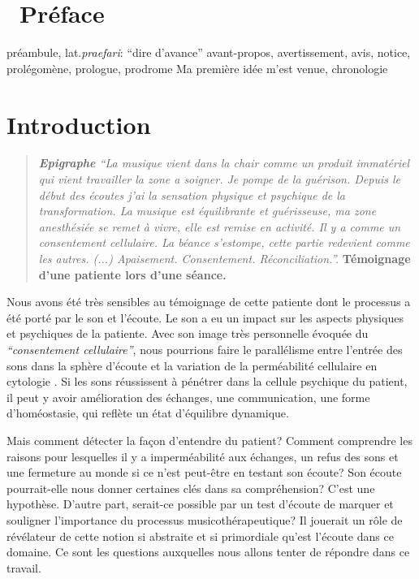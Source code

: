 
\chapter{\ Préface}
préambule, lat.\textit{praefari}: ``dire d'avance''
avant-propos, avertissement, avis, notice, prolégomène, prologue, prodrome
Ma première idée m'est venue, chronologie


\chapter{Introduction}



\begin{quotation}
 \textit{\textbf{Epigraphe  }   ``La musique vient dans la chair comme un produit immatériel
 qui vient travailler la zone a soigner. Je pompe de la
 guérison.
Depuis le début des écoutes j'ai la sensation physique et
 psychique de la
 transformation.
 La musique est équilibrante et guérisseuse, ma zone
 anesthésiée se remet à vivre, elle est remise en activité.
 Il y a comme un consentement cellulaire.
La béance s'estompe, cette
partie redevient comme les autres. (...)
Apaisement. Consentement. Réconciliation.''.} \textbf{Témoignage d'une
patiente lors d'une séance.}

\end{quotation}

Nous avons été très sensibles au témoignage de cette patiente dont le
processus a été porté par le son et l'écoute. Le son a eu un impact
sur les aspects physiques
et psychiques de la patiente.
Avec son image très personnelle évoquée du
\textit{``consentement cellulaire''}, nous pourrions faire le
parallélisme entre l'entrée des sons dans la sphère d'écoute et la variation de la 
perméabilité cellulaire en cytologie \autocite[ch. 3 pp. 70--76]{marieb:biologie}. Si les sons réussissent à pénétrer dans la
cellule psychique du patient, il peut y avoir amélioration des
échanges, une 
communication, une forme d'homéostasie,  \autocite[ch. 1
pp. 10]{marieb:biologie} qui reflète un état d'équilibre dynamique.

Mais comment détecter la façon d'entendre du patient?
Comment comprendre les raisons pour lesquelles il y a imperméabilité aux
échanges, un refus des sons et une fermeture au monde si ce n'est
peut-être  en testant
son écoute?  Son écoute pourrait-elle nous donner certaines clés dans sa
compréhension? C'est une hypothèse.
D'autre part, serait-ce  possible  par un test d'écoute
de marquer et souligner l'importance du processus musicothérapeutique? 
Il jouerait un
rôle de
révélateur de cette notion si abstraite et si primordiale qu'est
l'écoute dans ce domaine.
Ce sont les questions auxquelles nous allons tenter de
répondre dans ce travail.


